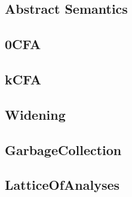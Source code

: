 % 

\subsection{Abstract Semantics}
% 

\subsection{0CFA}
% 

\subsection{kCFA}
% 

\subsection{Widening}
% 

\subsection{GarbageCollection}
% 

\subsection{LatticeOfAnalyses}
% 
